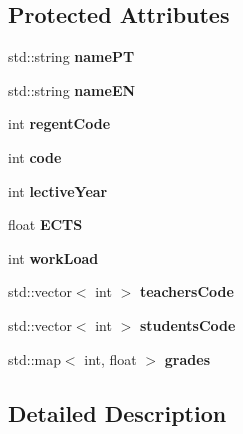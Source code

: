 \subsection*{Protected Attributes}
\begin{DoxyCompactItemize}
\item 
\mbox{\label{classSubject_a6a737e1a646acda7d16f0f4d62dbd6e1}} 
std\+::string {\bfseries name\+PT}
\item 
\mbox{\label{classSubject_aa78ad6c245d0adb04661d754f545bf7f}} 
std\+::string {\bfseries name\+EN}
\item 
\mbox{\label{classSubject_a7fc044615a85c88d8a09b19aa782f4fa}} 
int {\bfseries regent\+Code}
\item 
\mbox{\label{classSubject_a69b906cc97243b4c6def833f2de8115f}} 
int {\bfseries code}
\item 
\mbox{\label{classSubject_ac47c5327d56f61d8ec5acb7040775d3f}} 
int {\bfseries lective\+Year}
\item 
\mbox{\label{classSubject_aeb65ed41d5e97b96528d10e9166d85f5}} 
float {\bfseries E\+C\+TS}
\item 
\mbox{\label{classSubject_a868584632f241bbba39f7adc35dc276f}} 
int {\bfseries work\+Load}
\item 
\mbox{\label{classSubject_a5d16b700a6d4e2d93bcbf1fdd2c5c08c}} 
std\+::vector$<$ int $>$ {\bfseries teachers\+Code}
\item 
\mbox{\label{classSubject_a3b5cc22b3be0be611a2626a705882fa5}} 
std\+::vector$<$ int $>$ {\bfseries students\+Code}
\item 
\mbox{\label{classSubject_a708b21c280618eac769d1711bac4749e}} 
std\+::map$<$ int, float $>$ {\bfseries grades}
\end{DoxyCompactItemize}


\subsection{Detailed Description}


